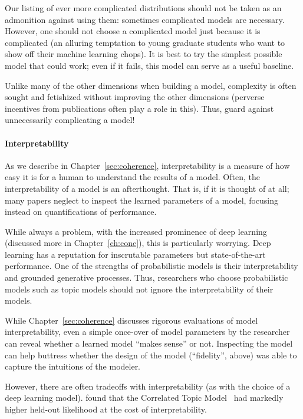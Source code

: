 Our listing of ever more complicated distributions should not be taken
as an admonition against using them: sometimes complicated models are
necessary.  However, one should not choose a complicated model just
because it is complicated (an alluring temptation to young graduate
students who want to show off their machine learning chops). It is
best to try the simplest possible model that could work; even if it
fails, this model can serve as a useful baseline.

Unlike many of the other dimensions when building a model, complexity
is often sought and fetishized without improving the other dimensions
(perverse incentives from publications often play a role in this).
Thus, guard against unnecessarily
complicating a model!

\paragraph{Interpretability}

As we describe in Chapter~\ref{sec:coherence}, interpretability is a measure of how
easy it is for a human to understand the results of a model.  Often,
the interpretability of a model is an afterthought.  That is, if it is thought of
at all; many papers neglect to inspect the learned parameters of a
model, focusing instead on quantifications of performance.

While always a problem, with the increased prominence of deep learning (discussed more in
Chapter~\ref{ch:conc}), this is particularly worrying.  Deep learning has a
reputation for inscrutable parameters but state-of-the-art
performance.  One of the strengths of probabilistic models is their
interpretability and grounded generative processes.  Thus, researchers who
choose probabilistic models such as topic models should not ignore the
interpretability of their models.

While Chapter~\ref{sec:coherence} discusses rigorous evaluations of
model interpretability, even a simple once-over of model
parameters by the researcher can reveal whether a learned model
``makes sense'' or not.  Inspecting the model can help buttress
whether the design of the model (``fidelity'', above) was able to
capture the intuitions of the modeler.

However, there are often tradeoffs with interpretability (as with the
choice of a deep learning model).  \citet{chang-09a} found that the Correlated
Topic Model~\citep{blei2007correlated} had markedly higher held-out likelihood at the
cost of interpretability.

